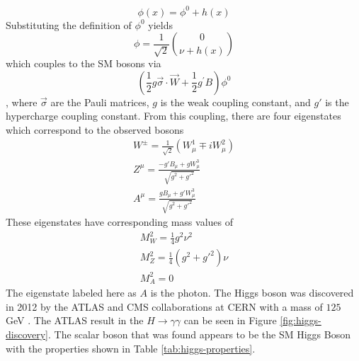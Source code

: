 		\begin{equation}\label{eqn:phi-h} \phi(x) = \phi^0 + h(x) \end{equation}
		Substituting the definition of $\phi^0$ yields
		\begin{equation}\label{eqn:phi-h-vec} \phi = \frac{1}{\sqrt{2}} \binom{0}{\nu+h(x)} \end{equation}
		which couples to the \gls{SM} bosons via 
		\begin{equation}\label{eqn:coupling} (\frac{1}{2} g \vec{\sigma} \cdot \vec{W} + \frac{1}{2} g^\prime B ) \phi^0  \end{equation}, where $\vec{\sigma}$ are the Pauli matrices, $g$ is the weak coupling constant, and $g\prime$ is the hypercharge coupling constant. From this coupling, there are four eigenstates which correspond to the observed bosons
		\begin{equation}\label{eqn:mass-eigenstates} \begin{split}
		W^\pm = \frac{1}{\sqrt{2}} ( W^1_\mu \mp i W^2_\mu ) \\
		Z^\mu = \frac{ - g\prime B_\mu + g W^3_\mu }{ \sqrt{g^2+g\prime^2} } \\
		A^\mu = \frac{ g B_\mu + g\prime W^3_\mu }{ \sqrt{g^2+g\prime^2} }
		\end{split}
		\end{equation}
		These eigenstates have corresponding mass values of 
		\begin{equation}\label{eqn:mass-eigenstates-masses} \begin{split}
		M^2_W = \frac{1}{4}g^2\nu^2 \\
		M^2_Z = \frac{1}{4}(g^2+g\prime^2)\nu \\
		M^2_A = 0
		\end{split}
		\end{equation}
		The eigenstate labeled here as $A$ is the photon. The Higgs boson was discovered in 2012 by the \gls{ATLAS} and \gls{CMS} collaborations at \gls{CERN} with a mass of $125$ GeV \cite{higgs-discovery-atlas}. The \gls{ATLAS} result in the $H \to \gamma \gamma$ can be seen in Figure \ref{fig:higgs-discovery}. The scalar boson that was found appears to be the \gls{SM} Higgs Boson with the properties shown in Table \ref{tab:higgs-properties}.

		\begin{table}[!thp]
			\centering
			\caption{The Higgs boson's properties \cite{pdg}}
			\label{tab:higgs-properties}
		\end{table}

